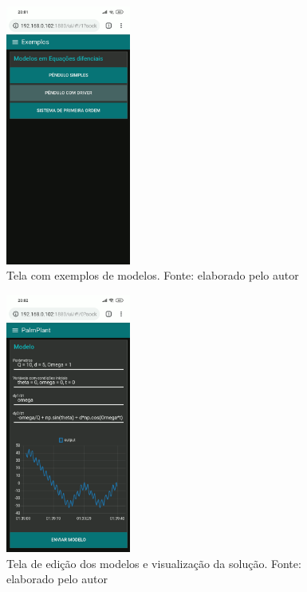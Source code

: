 \documentclass[journal]{IEEEtranTIE}
\begin{document}
\begin{figure}[H]
	\centering
	\includegraphics[width=4.1cm]{img/examples.png}
    \caption{Tela com exemplos de modelos. Fonte: elaborado pelo autor}
    \label{fig:examples}
\end{figure}


\begin{figure}[H]
	\centering
	\includegraphics[width=4.1cm]{img/running.png}
    \caption{Tela de edição dos modelos e visualização da solução. Fonte: elaborado pelo autor}
    \label{fig:running}
\end{figure}
\end{document}
